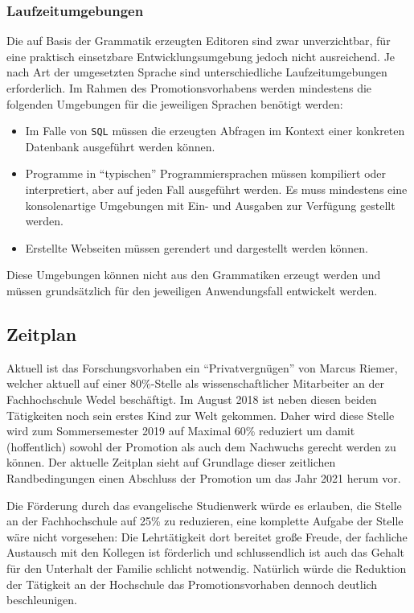 \documentclass[paper=a4,fontsize=12pt,parskip=half]{scrartcl}
\begin{document}
\subsubsection{Laufzeitumgebungen}

Die auf Basis der Grammatik erzeugten Editoren sind zwar unverzichtbar, für eine praktisch einsetzbare Entwicklungsumgebung jedoch nicht ausreichend. Je nach Art der umgesetzten Sprache sind unterschiedliche Laufzeitumgebungen erforderlich. Im Rahmen des Promotionsvorhabens werden mindestens die folgenden Umgebungen für die jeweiligen Sprachen benötigt werden:

\begin{itemize}
\item Im Falle von \texttt{SQL} müssen die erzeugten Abfragen im Kontext einer konkreten Datenbank ausgeführt werden können.
\item Programme in \enquote{typischen} Programmiersprachen müssen kompiliert oder interpretiert, aber auf jeden Fall ausgeführt werden. Es muss mindestens eine konsolenartige Umgebungen mit Ein- und Ausgaben zur Verfügung gestellt werden.
\item Erstellte Webseiten müssen gerendert und dargestellt werden können.
\end{itemize}

Diese Umgebungen können nicht aus den Grammatiken erzeugt werden und müssen grundsätzlich für den jeweiligen Anwendungsfall entwickelt werden.

\subsection{Zeitplan}

Aktuell ist das Forschungsvorhaben ein \enquote{Privatvergnügen} von Marcus Riemer, welcher aktuell auf einer 80\%-Stelle als wissenschaftlicher Mitarbeiter an der Fachhochschule Wedel beschäftigt. Im August 2018 ist neben diesen beiden Tätigkeiten noch sein erstes Kind zur Welt gekommen. Daher wird diese Stelle wird zum Sommersemester 2019 auf Maximal 60\% reduziert um damit (hoffentlich) sowohl der Promotion als auch dem Nachwuchs gerecht werden zu können. Der aktuelle Zeitplan sieht auf Grundlage dieser zeitlichen Randbedingungen einen Abschluss der Promotion um das Jahr 2021 herum vor.

Die Förderung durch das evangelische Studienwerk würde es erlauben, die Stelle an der Fachhochschule auf 25\% zu reduzieren, eine komplette Aufgabe der Stelle wäre nicht vorgesehen: Die Lehrtätigkeit dort bereitet große Freude, der fachliche Austausch mit den Kollegen ist förderlich und schlussendlich ist auch das Gehalt für den Unterhalt der Familie schlicht notwendig. Natürlich würde die Reduktion der Tätigkeit an der Hochschule das Promotionsvorhaben dennoch deutlich beschleunigen.
\end{document}
